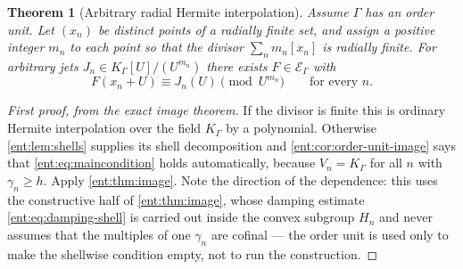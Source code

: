 \documentclass[11pt]{article}
\newtheorem{theorem}{Theorem}[section]
\theoremstyle{plain}
\theoremstyle{plain}
\theoremstyle{plain}
\theoremstyle{definition}
\theoremstyle{definition}
\theoremstyle{definition}
\theoremstyle{definition}
\theoremstyle{remark}
\newcommand{\K}{K_\Gamma}\newcommand{\KD}{K_\Delta}
\newcommand{\E}{\mathcal E_\Gamma}
\begin{document}
\begin{theorem}[Arbitrary radial Hermite interpolation]
\label{ent:thm:interpolation}
Assume $\Gamma$ has an order unit. Let $(x_n)$ be distinct points of a
radially finite set, and assign a positive integer $m_n$ to each point so
that the divisor $\sum_nm_n[x_n]$ is radially finite. For arbitrary jets
$J_n\in\K[U]/(U^{m_n})$ there exists $F\in\E$ with
\[
 F(x_n+U)\equiv J_n(U)\pmod{U^{m_n}}
 \qquad\text{for every }n.
\]
\end{theorem}
\begin{proof}[First proof, from the exact image theorem]
If the divisor is finite this is ordinary Hermite interpolation over the
field $\K$ by a polynomial. Otherwise \cref{ent:lem:shells} supplies its
shell decomposition and \cref{ent:cor:order-unit-image} says that
\eqref{ent:eq:maincondition} holds automatically, because $V_n=\K$ for all
$n$ with $\gamma_n\ge h$. Apply \cref{ent:thm:image}. Note the direction of
the dependence: this uses the constructive half of \cref{ent:thm:image},
whose damping estimate \eqref{ent:eq:damping-shell} is carried out inside the
convex subgroup $H_n$ and never assumes that the multiples of one $\gamma_n$
are cofinal --- the order unit is used only to make the shellwise condition
empty, not to run the construction.
\end{proof}
\end{document}
